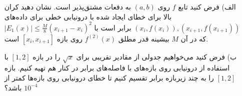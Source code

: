 \begin{enumerate}
	\item[الف)] 	 فرض کنید تابع
	\(f\)
	روی
	\((a,b)\)
	به دفعات مشتق‌پذیر است. نشان دهید کران بالا برای خطای ایجاد شده با درونیابی خطی برای داده‌های
\((x_i, f(x_i)), (x_{i+1}, f(x_{i+1}))\)
	برابر است با 
\(|E_1(x)| \leq \frac{M}{8}(x_{i+1}-x_i)^2\)
	که در آن
	\(M\)
	بیشینه قدر مطلق 
	\(f^{(2)}(x)\)
	روی بازه
	\([x_i, x_{i+1}]\)
	است.
	\vspace*{.3cm}
	\item[ب)] فرض کنید می‌خواهیم جدولی از مقادیر تقریبی برای
	$\sqrt{x}$
	را در بازه
	\([1,2]\)
	با استفاده از درونیابی روی بازه‌های با فاصله‌های برابر در کنار هم تهیه کنیم.
	بازه 
	\([1,2]\)
	را به چند زیربازه برابر تقسیم کنیم تا خطای درونیابی روی بازه‌ها کمتر از 
	\(10^{-4}\)
	باشد؟
\end{enumerate}